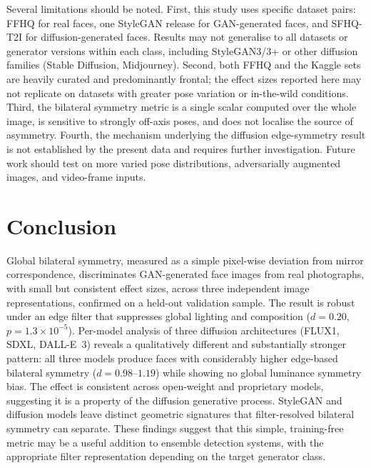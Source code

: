 \documentclass[11pt,a4paper]{article}
\begin{document}
Several limitations should be noted. First, this study uses specific dataset
pairs: FFHQ for real faces, one StyleGAN release for GAN-generated faces, and
SFHQ-T2I for diffusion-generated faces. Results may not generalise to all
datasets or generator versions within each class, including StyleGAN3/3+ or
other diffusion families (Stable Diffusion, Midjourney). Second, both FFHQ and
the Kaggle sets are heavily curated and predominantly frontal; the effect sizes
reported here may not replicate on datasets with greater pose variation or
in-the-wild conditions. Third, the bilateral symmetry metric is a single scalar
computed over the whole image, is sensitive to strongly off-axis poses, and does
not localise the source of asymmetry. Fourth, the mechanism underlying the
diffusion edge-symmetry result is not established by the present data and
requires further investigation. Future work should test on more varied pose
distributions, adversarially augmented images, and video-frame inputs.

\section{Conclusion}

Global bilateral symmetry, measured as a simple pixel-wise deviation from mirror
correspondence, discriminates GAN-generated face images from real photographs,
with small but consistent effect sizes, across three independent image
representations, confirmed on a held-out validation sample. The result is robust
under an edge filter that suppresses global lighting and composition
($d = 0.20$, $p = 1.3 \times 10^{-5}$). Per-model analysis of three
diffusion architectures (FLUX1, SDXL, DALL-E~3) reveals a qualitatively
different and substantially stronger pattern: all three models produce faces
with considerably higher edge-based bilateral symmetry ($d = 0.98$--$1.19$)
while showing no global luminance symmetry bias. The effect is consistent across
open-weight and proprietary models, suggesting it is a property of the diffusion
generative process. StyleGAN and diffusion models leave distinct geometric
signatures that filter-resolved bilateral symmetry can separate. These findings
suggest that this simple, training-free metric may be a useful
addition to ensemble detection systems, with the appropriate filter representation
depending on the target generator class.

\end{document}

